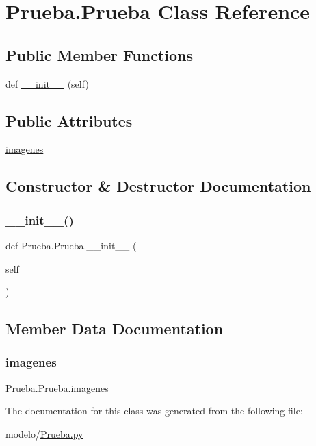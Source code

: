 \hypertarget{class_prueba_1_1_prueba}{}\section{Prueba.\+Prueba Class Reference}
\label{class_prueba_1_1_prueba}
\subsection*{Public Member Functions}
\begin{DoxyCompactItemize}
\item 
def \mbox{\hyperlink{class_prueba_1_1_prueba_a859d4d75bdd38a251809249b0a815551}{\+\_\+\+\_\+init\+\_\+\+\_\+}} (self)
\end{DoxyCompactItemize}
\subsection*{Public Attributes}
\begin{DoxyCompactItemize}
\item 
\mbox{\hyperlink{class_prueba_1_1_prueba_af266bba2aecfbc1220e982cc10e3ac0a}{imagenes}}
\end{DoxyCompactItemize}


\subsection{Constructor \& Destructor Documentation}
\mbox{\label{class_prueba_1_1_prueba_a859d4d75bdd38a251809249b0a815551}} 
\subsubsection{\texorpdfstring{\+\_\+\+\_\+init\+\_\+\+\_\+()}{\_\_init\_\_()}}
{\footnotesize\ttfamily def Prueba.\+Prueba.\+\_\+\+\_\+init\+\_\+\+\_\+ (\begin{DoxyParamCaption}\item[{}]{self }\end{DoxyParamCaption})}



\subsection{Member Data Documentation}
\mbox{\label{class_prueba_1_1_prueba_af266bba2aecfbc1220e982cc10e3ac0a}} 
\subsubsection{\texorpdfstring{imagenes}{imagenes}}
{\footnotesize\ttfamily Prueba.\+Prueba.\+imagenes}



The documentation for this class was generated from the following file\+:\begin{DoxyCompactItemize}
\item 
modelo/\mbox{\hyperlink{_prueba_8py}{Prueba.\+py}}\end{DoxyCompactItemize}

